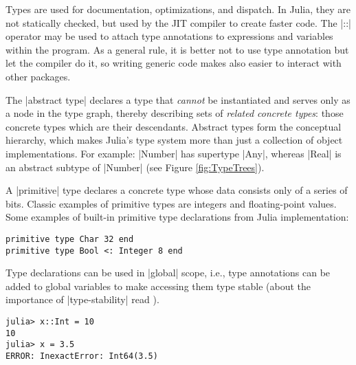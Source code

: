 

Types are used for documentation, optimizations, and dispatch. In Julia, they are not statically checked, but used by the JIT compiler to create faster code.
The |::| operator may be used to attach type annotations to expressions and variables within the program. As a general rule, it is better not to use type annotation but let the compiler do it, so writing generic code makes also easier to interact with other packages.

The |abstract type| declares a type that \emph{cannot} be instantiated and serves only as a node in the type graph, thereby describing sets of \emph{related concrete types}: those concrete types which are their descendants. Abstract types form the conceptual hierarchy, which makes Julia’s type system more than just a collection of object implementations. For example:
|Number| has supertype |Any|, whereas |Real| is an abstract subtype of |Number| (see Figure \ref{fig:TypeTrees}).

A |primitive| type declares a concrete type whose data consists only of a series of bits. Classic examples of primitive types are integers and floating-point values. Some examples of built-in primitive type declarations from Julia implementation:

\begin{lstlisting}[language=JuliaLocal, style=julia]
primitive type Char 32 end
primitive type Bool <: Integer 8 end
\end{lstlisting}

Type declarations can be used in |global| scope, i.e., type annotations can be added to global variables to make accessing them type stable  (about the importance of |type-stability| read \cite{typestable:21}).

\begin{lstlisting}[language=JuliaLocal, style=julia]
julia> x::Int = 10
10
julia> x = 3.5
ERROR: InexactError: Int64(3.5)
\end{lstlisting}





